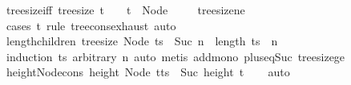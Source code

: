 \begin{isabellebody}
\ tree{\isacharunderscore}{\kern0pt}size{\isacharunderscore}{\kern0pt}{}{\isacharunderscore}{\kern0pt}iff{\isacharcolon}{\kern0pt}\ {\isachardoublequoteopen}tree{\isacharunderscore}{\kern0pt}size\ t\ {\isacharequal}{\kern0pt}\ {}\ {\isasymlongleftrightarrow}\ t\ {\isacharequal}{\kern0pt}\ Node\ {\isacharbrackleft}{\kern0pt}{\isacharbrackright}{\kern0pt}{\isachardoublequoteclose}\isanewline
%
\isadelimproof
\ \ %
\endisadelimproof
%
\isatagproof
{}\isamarkupfalse%
\ tree{\isacharunderscore}{\kern0pt}size{\isacharunderscore}{\kern0pt}ne{\isacharunderscore}{\kern0pt}{}\ \isamarkupfalse%
\ {\isacharparenleft}{\kern0pt}cases\ t\ rule{\isacharcolon}{\kern0pt}\ tree{\isacharunderscore}{\kern0pt}cons{\isacharunderscore}{\kern0pt}exhaust{\isacharparenright}{\kern0pt}\ auto%
\endisatagproof
{\isafoldproof}%
%
\isadelimproof
\isanewline
%
\endisadelimproof
\isanewline
{}\isamarkupfalse%
\ length{\isacharunderscore}{\kern0pt}children{\isacharcolon}{\kern0pt}\ {\isachardoublequoteopen}tree{\isacharunderscore}{\kern0pt}size\ {\isacharparenleft}{\kern0pt}Node\ ts{\isacharparenright}{\kern0pt}\ {\isacharequal}{\kern0pt}\ Suc\ n\ {\isasymLongrightarrow}\ length\ ts\ {\isasymle}\ n{\isachardoublequoteclose}\isanewline
%
\isadelimproof
\ \ %
\endisadelimproof
%
\isatagproof
{}\isamarkupfalse%
\ {\isacharparenleft}{\kern0pt}induction\ ts\ arbitrary{\isacharcolon}{\kern0pt}\ n{\isacharcomma}{\kern0pt}\ auto{\isacharcomma}{\kern0pt}\ metis\ add{\isacharunderscore}{\kern0pt}mono\ plus{\isacharunderscore}{\kern0pt}{}{\isacharunderscore}{\kern0pt}eq{\isacharunderscore}{\kern0pt}Suc\ tree{\isacharunderscore}{\kern0pt}size{\isacharunderscore}{\kern0pt}ge{\isacharunderscore}{\kern0pt}{}{\isacharparenright}{\kern0pt}%
\endisatagproof
{\isafoldproof}%
%
\isadelimproof
\isanewline
%
\endisadelimproof
\isanewline
\isanewline
{}\isamarkupfalse%
\ height{\isacharunderscore}{\kern0pt}Node{\isacharunderscore}{\kern0pt}cons{\isacharcolon}{\kern0pt}\ {\isachardoublequoteopen}height\ {\isacharparenleft}{\kern0pt}Node\ {\isacharparenleft}{\kern0pt}t{\isacharhash}{\kern0pt}ts{\isacharparenright}{\kern0pt}{\isacharparenright}{\kern0pt}\ {\isasymge}\ Suc\ {\isacharparenleft}{\kern0pt}height\ t{\isacharparenright}{\kern0pt}{\isachardoublequoteclose}\isanewline
%
\isadelimproof
\ \ %
\endisadelimproof
%
\isatagproof
{}\isamarkupfalse%
\ auto%
\endisatagproof
{\isafoldproof}%
%
\isadelimproof
\isanewline
%
\endisadelimproof
\isanewline
{}\isamarkupfalse%

\end{isabellebody}
